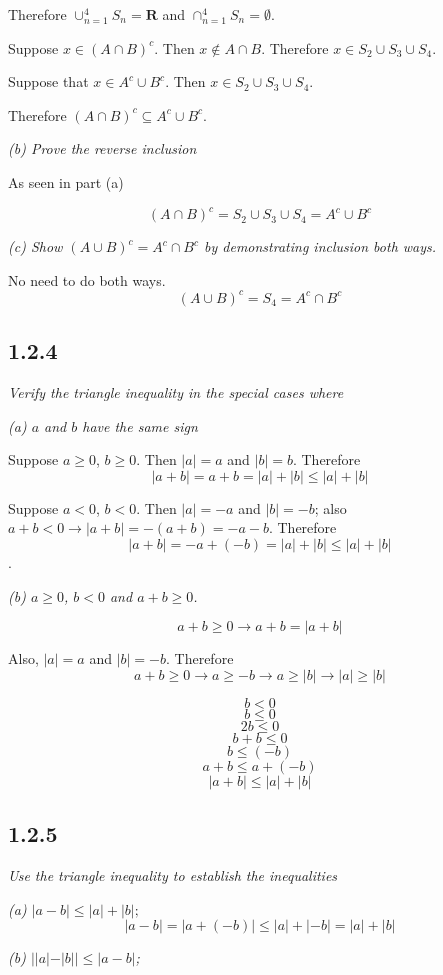 \documentclass[11pt,oneside,titlepage]{book}
\begin{document}
Therefore $\cup_{n = 1}^4 S_n = \textbf{R}$ and
$\cap_{n = 1}^4 S_n = \emptyset$.

Suppose $x \in (A \cap B)^c$. Then $x \notin A \cap B$. Therefore
$x \in S_2 \cup S_3 \cup S_4$.

Suppose that $x \in A^c \cup B^c$. Then $x \in S_2 \cup S_3 \cup S_4$.

Therefore $ (A \cap B)^c \subseteq A^c \cup B^c$.

\textit{(b) Prove the reverse inclusion}


As seen in part (a)

$$(A \cap B)^c = S_2 \cup S_3 \cup S_4 = A^c \cup B^c$$

\textit{(c) Show $(A \cup B)^c = A^c \cap B^c$ by demonstrating inclusion both
  ways.}

No need to do both ways.
$$(A \cup B)^c = S_4 = A^c \cap B^c$$


\subsection*{1.2.4}
\textit{Verify the triangle inequality in the special cases where }

\textit{(a) $a$ and $b$ have the same sign}

Suppose $a \geq 0$, $b \geq 0$. Then $|a| = a$ and $|b| = b$. Therefore
$$|a + b| = a + b = |a| + |b| \leq  |a| + |b|$$

Suppose $a < 0$, $b < 0$. Then $|a| = -a$ and $|b| = -b$; also $a + b < 0 \to
|a + b| = -(a + b) = -a - b$. Therefore 
$$|a + b| = -a + (-b) = |a| + |b| \leq  |a| + |b|$$.

\textit{(b) $a \geq 0$, $b < 0$ and $a + b \geq 0$.}

$$a + b \geq 0 \to a + b = |a + b|$$

Also, $|a| = a$ and $|b| = -b$. Therefore
$$a + b \geq 0 \to a \geq -b \to a \geq |b| \to |a| \geq |b|$$

$$ b < 0$$
$$ b \leq 0$$
$$ 2b \leq 0$$
$$ b + b \leq 0$$
$$ b \leq (-b)$$
$$a + b \leq a + (-b)$$
$$|a + b| \leq |a| + |b|$$

\subsection*{1.2.5}
\textit{Use the triangle inequality to establish the inequalities}

\textit{(a) $|a - b| \leq |a| + |b|;$}
$$|a - b| = |a + (-b)| \leq |a| + |-b| = |a| + |b|$$

\textit{(b) $||a| - |b|| \leq |a - b|$;}
\end{document}

